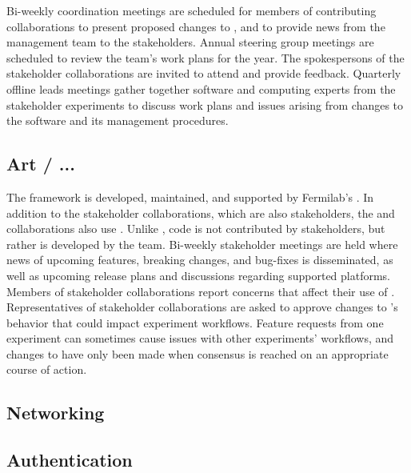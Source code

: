 \documentclass[../main-00.tex]{subfiles}
\begin{document}
Bi-weekly  coordination meetings are scheduled for members of contributing collaborations to present proposed changes to , and to provide news from the management team to the stakeholders.  Annual  steering group meetings are scheduled to review the  team's work plans for the year.  The spokespersons of the stakeholder collaborations are invited to attend and provide feedback.  Quarterly  offline leads meetings gather together software and computing experts from the stakeholder experiments to discuss work plans and issues arising from changes to the software and its management procedures.

\subsection{Art / ...  }

The  framework is developed, maintained, and supported by Fermilab's .  In addition to the  stakeholder collaborations, which are also  stakeholders, the  and  collaborations also use .  Unlike , code is not contributed by stakeholders, but rather is developed by the  team.  Bi-weekly  stakeholder meetings are held where news of upcoming  features, breaking changes, and bug-fixes is disseminated, as well as upcoming release plans and discussions regarding supported platforms.  Members of stakeholder collaborations report concerns that affect their use of .  Representatives of stakeholder collaborations are asked to approve changes to 's behavior that could impact experiment workflows.  Feature requests from one experiment can sometimes cause issues with other experiments' workflows, and changes to  have only been made when consensus is reached on an appropriate course of action.

\subsection{Networking }
\subsection{Authentication }


\end{document}
